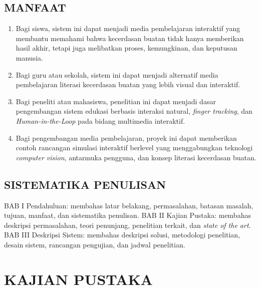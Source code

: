 \documentclass[12pt,a4paper,oneside,openany]{report}
\begin{document}
\section{MANFAAT}
\label{sec:manfaat}

\begin{enumerate}
    \item Bagi siswa, sistem ini dapat menjadi media pembelajaran interaktif yang membantu memahami bahwa kecerdasan buatan tidak hanya memberikan hasil akhir, tetapi juga melibatkan proses, kemungkinan, dan keputusan manusia.
    \item Bagi guru atau sekolah, sistem ini dapat menjadi alternatif media pembelajaran literasi kecerdasan buatan yang lebih visual dan interaktif.
    \item Bagi peneliti atau mahasiswa, penelitian ini dapat menjadi dasar pengembangan sistem edukasi berbasis interaksi natural, \textit{finger tracking}, dan \textit{Human-in-the-Loop} pada bidang multimedia interaktif.
    \item Bagi pengembangan media pembelajaran, proyek ini dapat memberikan contoh rancangan simulasi interaktif berlevel yang menggabungkan teknologi \textit{computer vision}, antarmuka pengguna, dan konsep literasi kecerdasan buatan.
\end{enumerate}

\section{SISTEMATIKA PENULISAN}
\label{sec:sistematika-penulisan}

BAB I Pendahuluan: membahas latar belakang, permasalahan, batasan masalah, tujuan, manfaat, dan sistematika penulisan. BAB II Kajian Pustaka: membahas deskripsi permasalahan, teori penunjang, penelitian terkait, dan \textit{state of the art}. BAB III Deskripsi Sistem: membahas deskripsi solusi, metodologi penelitian, desain sistem, rancangan pengujian, dan jadwal penelitian.

\chapter{KAJIAN PUSTAKA}
\label{chap:bab2}
\end{document}
